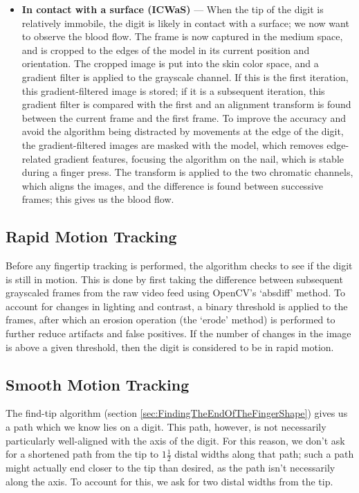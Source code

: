 \begin{itemize}
\item \textbf{In contact with a surface (ICWaS)} --- When the tip of the digit is relatively immobile, the digit is likely in contact with a surface; we now want to observe the blood flow. The frame is now captured in the medium space, and is cropped to the edges of the model in its current position and orientation. The cropped image is put into the skin color space, and a gradient filter is applied to the grayscale channel. If this is the first iteration, this gradient-filtered image is stored; if it is a subsequent iteration, this gradient filter is compared with the first and an alignment transform is found between the current frame and the first frame. To improve the accuracy and avoid the algorithm being distracted by movements at the edge of the digit, the gradient-filtered images are masked with the model, which removes edge-related gradient features, focusing the algorithm on the nail, which is stable during a finger press. The transform is applied to the two chromatic channels, which aligns the images, and the difference is found between successive frames; this gives us the blood flow. 
\end{itemize}

\subsection{Rapid Motion Tracking}\label{sec:RapidMotionTracking}
Before any fingertip tracking is performed, the algorithm checks to see if the digit is still in motion. This is done by first taking the difference between subsequent grayscaled frames from the raw video feed using OpenCV's `absdiff' method. To account for changes in lighting and contrast, a binary threshold is applied to the frames, after which an erosion operation (the `erode' method) is performed to further reduce artifacts and false positives. If the number of changes in the image is above a given threshold, then the digit is considered to be in rapid motion.


\subsection{Smooth Motion Tracking}\label{sec:SmoothMotionTracking}

The find-tip algorithm (section \ref{sec:FindingTheEndOfTheFingerShape}) gives us a path which we know lies on a digit. This path, however, is not necessarily particularly well-aligned with the axis of the digit. For this reason, we don't ask for a shortened path from the tip to $1 \frac{1}{2}$ distal widths along that path; such a path might actually end closer to the tip than desired, as the path isn't necessarily along the axis. To account for this, we ask for two distal widths from the tip. 

